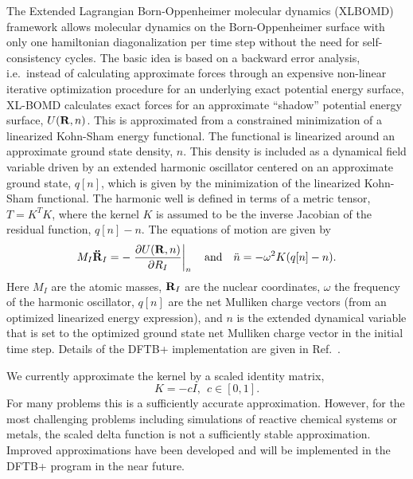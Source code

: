 \documentclass[reprint,onecolumn,superscriptaddress]{revtex4-1}
\newcommand{\dftbp}{DFTB+}
\begin{document}
The Extended Lagrangian Born-Oppenheimer molecular dynamics (XLBOMD) framework
allows\cite{ANiklasson08, ANiklasson17} molecular dynamics on the
Born-Oppenheimer surface with only one hamiltonian diagonalization per time step without the
need for self-consistency cycles.  The basic idea is based on a backward error
analysis, i.e.\ instead of calculating approximate forces through an expensive
non-linear iterative optimization procedure for an underlying exact potential
energy surface, XL-BOMD calculates exact forces for an approximate ``shadow'' potential energy surface, $U({\bf R},n)$. This is approximated from a
constrained minimization of a linearized Kohn-Sham energy functional.\cite{ANiklasson14,ANiklasson17} The functional is linearized around an
approximate ground state density, $n$. This density is included as a dynamical
field variable driven by an extended harmonic oscillator centered on an approximate ground state, $q[n]$, which is given by the minimization of the linearized Kohn-Sham functional. The harmonic well is
defined in terms of a metric tensor, $T = K^T K$, where the kernel $K$ is
assumed to be the inverse Jacobian of the residual function, $q[n] - n$.\cite{ANiklasson17}  The equations of motion are given by
\begin{equation}
  M_I{{\bf \ddot R}}_I = -\left. \frac{\partial U({\bf R},n)}{\partial
    R_I}\right \vert_n \quad \text{and} \quad {\ddot n} = -\omega^2 K(q[n] - n).
\end{equation}
Here $M_I$ are the atomic masses, ${\bf R}_I$ are the nuclear coordinates, $\omega$ the frequency of the harmonic oscillator, $q[n]$ are the net Mulliken charge vectors (from an optimized linearized energy expression), and $n$ is the extended dynamical
variable that is set to the optimized ground state net Mulliken charge vector in
the initial time step. Details of the \dftbp{} implementation are given in
Ref.~\cite{BAradi15}.

We currently approximate the kernel by a scaled
identity matrix,
\begin{equation}
  K = -cI, ~~ c\in [0,1].
\end{equation}
For many problems this is a sufficiently accurate approximation. However, for
the most challenging problems including simulations of reactive chemical systems
or metals, the scaled delta function is not a sufficiently stable
approximation. Improved approximations have been developed \cite{ANiklasson17}
and will be implemented in the \dftbp{} program in the near future.
\end{document}
